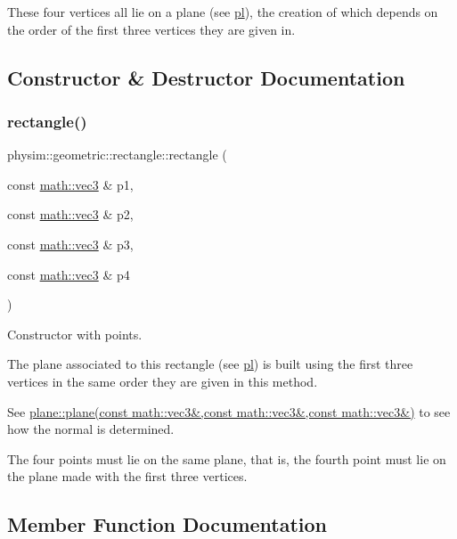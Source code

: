 These four vertices all lie on a plane (see \hyperlink{classphysim_1_1geometric_1_1rectangle_af9c8331b7c76cf77289e08af9b97531e}{pl}), the creation of which depends on the order of the first three vertices they are given in. 

\subsection{Constructor \& Destructor Documentation}
\mbox{\label{classphysim_1_1geometric_1_1rectangle_a19ee9fbc0666035eda867de84a7e7df1}} 
\subsubsection{\texorpdfstring{rectangle()}{rectangle()}}
{\footnotesize\ttfamily physim\+::geometric\+::rectangle\+::rectangle (\begin{DoxyParamCaption}\item[{const \hyperlink{structphysim_1_1math_1_1vec3}{math\+::vec3} \&}]{p1,  }\item[{const \hyperlink{structphysim_1_1math_1_1vec3}{math\+::vec3} \&}]{p2,  }\item[{const \hyperlink{structphysim_1_1math_1_1vec3}{math\+::vec3} \&}]{p3,  }\item[{const \hyperlink{structphysim_1_1math_1_1vec3}{math\+::vec3} \&}]{p4 }\end{DoxyParamCaption})}



Constructor with points. 

The plane associated to this rectangle (see \hyperlink{classphysim_1_1geometric_1_1rectangle_af9c8331b7c76cf77289e08af9b97531e}{pl}) is built using the first three vertices in the same order they are given in this method.

See \hyperlink{classphysim_1_1geometric_1_1plane_a5d793dd111e0b7c83c7e11b47c037637}{plane\+::plane(const math\+::vec3\&,const math\+::vec3\&,const math\+::vec3\&)} to see how the normal is determined.

The four points must lie on the same plane, that is, the fourth point must lie on the plane made with the first three vertices. 

\subsection{Member Function Documentation}
\mbox{\label{classphysim_1_1geometric_1_1rectangle_a7e80994ff1d2e2be4cdb3f195fc2edef}} 
